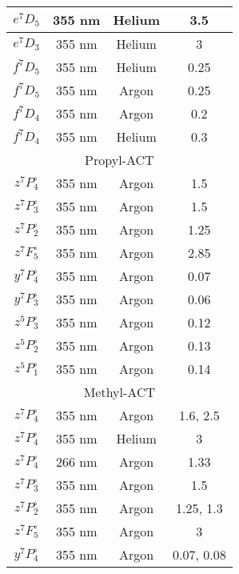 \documentclass[12pt,twoside]{reedthesis}
\begin{document}
\begin{longtable}{||c|c|c|c||}
  $e^{7}D_{5}$ & 355 nm & Helium & 3.5 \\\hline
  $e^{7}D_{3}$ & 355 nm & Helium & 3 \\\hline
  $f^{7}D_{5}$ & 355 nm & Helium & 0.25 \\\hline
  $f^{7}D_{5}$ & 355 nm & Argon & 0.25 \\\hline
  $f^{7}D_{4}$ & 355 nm & Argon & 0.2 \\\hline
  $f^{7}D_{4}$ & 355 nm & Helium & 0.3 \\\hline
  \multicolumn{4}{||c||}{Propyl-ACT} \\\hline
  $z^{7}P^{\circ}_{4}$ & 355 nm & Argon & 1.5 \\\hline
  $z^{7}P^{\circ}_{3}$ & 355 nm & Argon & 1.5 \\\hline
  $z^{7}P^{\circ}_{2}$ & 355 nm & Argon & 1.25 \\\hline
  $z^{7}F^{\circ}_{5}$ & 355 nm & Argon & 2.85 \\\hline
  $y^{7}P^{\circ}_{4}$ & 355 nm & Argon & 0.07 \\\hline
  $y^{7}P^{\circ}_{3}$ & 355 nm & Argon & 0.06 \\\hline
  $z^{5}P^{\circ}_{3}$ & 355 nm & Argon & 0.12 \\\hline
  $z^{5}P^{\circ}_{2}$ & 355 nm & Argon & 0.13 \\\hline
  $z^{5}P^{\circ}_{1}$ & 355 nm & Argon & 0.14 \\\hline
  \multicolumn{4}{||c||}{Methyl-ACT} \\\hline
  $z^{7}P^{\circ}_{4}$ & 355 nm & Argon & 1.6, 2.5 \\\hline
  $z^{7}P^{\circ}_{4}$ & 355 nm & Helium & 3 \\\hline
  $z^{7}P^{\circ}_{4}$ & 266 nm & Argon & 1.33 \\\hline
  $z^{7}P^{\circ}_{3}$ & 355 nm & Argon & 1.5 \\\hline
  $z^{7}P^{\circ}_{2}$ & 355 nm & Argon & 1.25, 1.3 \\\hline
  $z^{7}F^{\circ}_{5}$ & 355 nm & Argon & 3 \\\hline
  $y^{7}P^{\circ}_{4}$ & 355 nm & Argon & 0.07, 0.08 \\\hline

\end{longtable}
\end{document}
